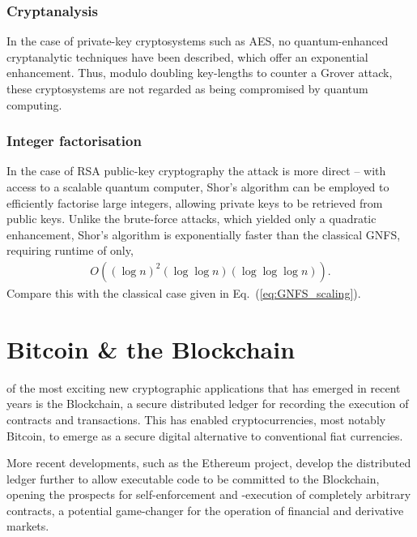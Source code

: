 %
%

\subsubsection{Cryptanalysis}

In the case of private-key cryptosystems such as AES, no quantum-enhanced cryptanalytic techniques have been described, which offer an exponential enhancement. Thus, modulo doubling key-lengths to counter a Grover attack, these cryptosystems are not regarded as being compromised by quantum computing.

%
%

\subsubsection{Integer factorisation}

In the case of RSA public-key cryptography the attack is more direct -- with access to a scalable quantum computer, Shor's algorithm can be employed to efficiently factorise large integers, allowing private keys to be retrieved from public keys. Unlike the brute-force attacks, which yielded only a quadratic enhancement, Shor's algorithm is exponentially faster than the classical GNFS, requiring runtime of only,
\begin{align}
	O((\log n)^2(\log\log n)(\log\log\log n)).
\end{align}
Compare this with the classical case given in Eq.~(\ref{eq:GNFS_scaling}).

%
%

\section{Bitcoin \& the Blockchain}\label{sec:bitcoin_blockchain}

 of the most exciting new cryptographic applications that has emerged in recent years is the Blockchain, a secure distributed ledger for recording the execution of contracts and transactions. This has enabled cryptocurrencies, most notably Bitcoin, to emerge as a secure digital alternative to conventional fiat currencies.

More recent developments, such as the Ethereum project, develop the distributed ledger further to allow executable code to be committed to the Blockchain, opening the prospects for self-enforcement and -execution of completely arbitrary contracts, a potential game-changer for the operation of financial and derivative markets.

